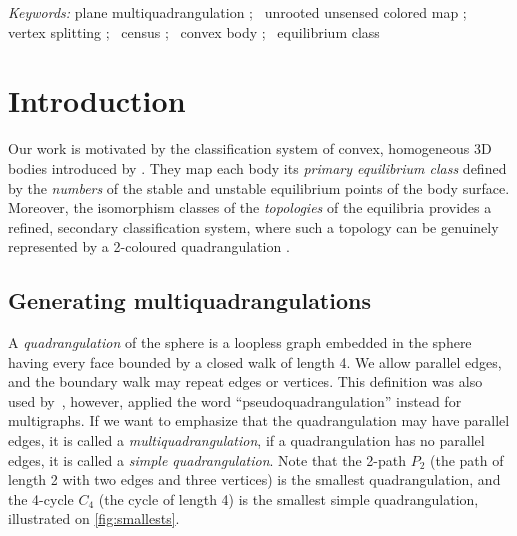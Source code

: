 \documentclass[]{article}
\newenvironment{keyword}{\emph{Keywords: }}{}
\newcommand{\sep}{;\ }
\begin{document}
\begin{keyword}
plane multiquadrangulation
\sep
unrooted unsensed colored map
\sep
vertex splitting
\sep
census
\sep
convex body
\sep
equilibrium class




\end{keyword}






















\section{Introduction}
\label{sec:intro}

Our work is motivated by the classification system of convex, homogeneous 3D bodies introduced by \citet{Domokos2006}.
They map each body its \emph{primary equilibrium class} defined by the \emph{numbers} of the stable and unstable equilibrium points of the body surface.
Moreover, the isomorphism classes of the \emph{topologies} of the equilibria provides a refined, secondary classification system, where such a topology can be genuinely represented by a 2-coloured quadrangulation \cite{Domokos2012}.

\subsection{Generating multiquadrangulations}

A \emph{quadrangulation} of the sphere is a loopless graph embedded in the sphere having every face bounded by a closed walk of length 4.
We allow parallel edges, and the boundary walk may repeat edges or vertices.
This definition was also used by~\citet{Mohar2010}, however, \citet{Archdeacon2001} applied the word ``pseudoquadrangulation'' instead for multigraphs.
If we want to emphasize that the quadrangulation may have parallel edges, it is called a \emph{multiquadrangulation},
if a quadrangulation has no parallel edges, it is called a \emph{simple quadrangulation}.
Note that the 2-path $P_2$ (the path of length 2 with two edges and three vertices) is the smallest quadrangulation, and the 4-cycle $C_4$ (the cycle of length 4) is the smallest simple quadrangulation, illustrated on \autoref{fig:smallests}.
\end{document}
